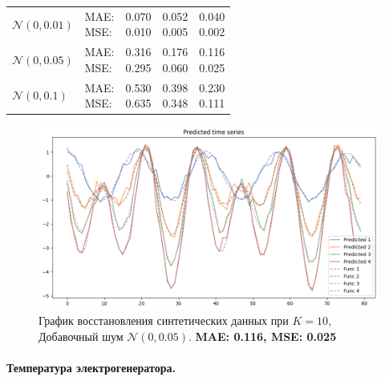 \documentclass{article}
\begin{document}
\def\arraystretch{2.3}
\begin{tabular}{|l||l||*{3}{c|}}\hline
	\backslashbox{Шум}{Параметры}
	&\makebox[3em]{Метрика}&\makebox[3em]{$K=2$}&\makebox[3em]{$K=4$}&\makebox[3em]{$K=10$}\\\hline
	$\mathcal{N}(0, 0.01)$&\makecell{ MAE: \\ MSE: } &\makecell{ 0.070 \\ 0.010 }&\makecell{ 0.052 \\ 0.005 }&\makecell{ 0.040 \\ 0.002 }\\\hline
	$\mathcal{N}(0, 0.05)$&\makecell{ MAE: \\ MSE: } &\makecell{ 0.316 \\ 0.295 }&\makecell{ 0.176 \\ 0.060 }&\makecell{ 0.116 \\ 0.025 }\\\hline
	$\mathcal{N}(0, 0.1)$& \makecell{ MAE: \\ MSE: } &\makecell{ 0.530 \\ 0.635 }&\makecell{ 0.398 \\ 0.348 }&\makecell{ 0.230 \\ 0.111 }\\\hline
\end{tabular}


\begin{figure}[H]
	\centering
	\includegraphics[width=\textwidth]{K10N005.png}
	\caption{График восстановления синтетических данных при $K=10$, Добавочный шум $\mathcal{N}(0, 0.05)$. \textbf{MAE: 0.116, MSE: 0.025}}
	\label{fig:fig6}
\end{figure}

\paragraph{Температура электрогенератора.}\
\end{document}
